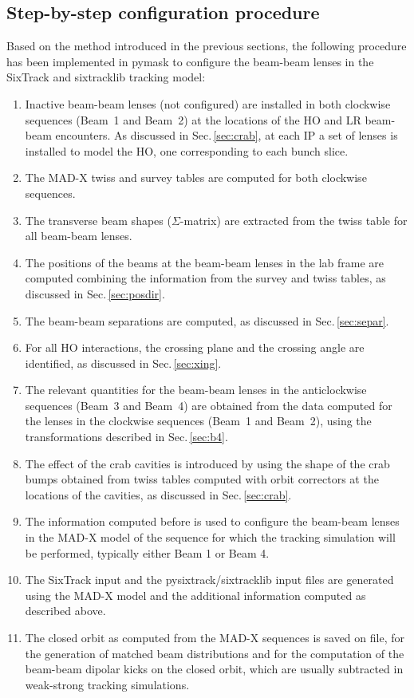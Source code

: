 \subsection{Step-by-step configuration procedure}

Based on the method introduced in the previous sections, the following procedure has been implemented in pymask to configure the beam-beam lenses in the SixTrack and sixtracklib tracking model:

\begin{enumerate}
\item Inactive beam-beam lenses (not configured) are installed in both clockwise sequences (Beam~1 and Beam~2) at the locations of the HO and LR beam-beam encounters. As discussed in Sec.\,\ref{sec:crab}, at each IP a set of lenses is installed to model the HO, one corresponding to each bunch slice.
\item The MAD-X twiss and survey tables are computed 
for both clockwise sequences.
\item The transverse beam shapes ($\Sigma$-matrix) are extracted from the twiss table for all beam-beam lenses.
\item The positions of the beams at the beam-beam lenses in the lab frame are computed combining the information from the survey and twiss tables, as discussed in Sec.\,\ref{sec:posdir}.
\item The beam-beam separations are computed, as discussed in Sec.\,\ref{sec:separ}.
\item For all HO interactions, the crossing plane and the crossing angle are identified, as discussed in Sec.\,\ref{sec:xing}.
\item The relevant quantities for the beam-beam lenses in the anticlockwise sequences (Beam~3 and Beam~4) are obtained from the data computed for the lenses in the clockwise sequences (Beam~1 and Beam~2), using the transformations described in Sec.\,\ref{sec:b4}.
\item The effect of the crab cavities is introduced by using the shape of the crab bumps obtained from twiss tables computed with orbit correctors at the locations of the cavities, as discussed in Sec.\,\ref{sec:crab}.
\item The information computed before is used to configure the beam-beam lenses in the MAD-X model of the sequence for which the tracking simulation will be performed, typically either Beam 1 or Beam 4.
\item The SixTrack input and the pysixtrack/sixtracklib input files are generated  using the MAD-X model and the additional information computed as described above. 
\item The closed orbit as computed from the MAD-X sequences is saved on file, for the generation of matched beam distributions and for the computation of the beam-beam dipolar kicks on the closed orbit, which are usually subtracted in weak-strong tracking simulations.
\end{enumerate}



